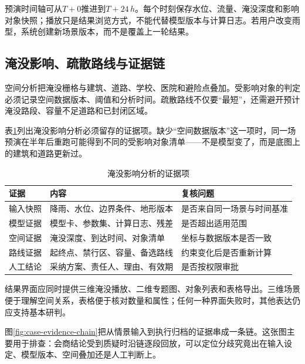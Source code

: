 预演时间轴可从$T+0$推进到$T+24\,h$。每个时刻保存水位、流量、淹没深度和影响对象快照；播放只是结果浏览方式，不能代替模型版本与计算日志。若用户改变雨型，系统创建新场景版本，而不是覆盖上一轮结果。

\subsection{淹没影响、疏散路线与证据链}

空间分析把淹没栅格与建筑、道路、学校、医院和避险点叠加。受影响对象的判定必须记录空间数据版本、阈值和分析时间。疏散路线不仅要“最短”，还需避开预计淹没路段、容量不足道路和已封闭区域。

表\ref{tab:inundation-evidence}列出淹没影响分析必须留存的证据项。缺少“空间数据版本”这一项时，同一场预演在半年后重跑可能得到不同的受影响对象清单——不是模型变了，而是底图上的建筑和道路更新过。

\begin{table}[htbp]
\centering
\caption{淹没影响分析的证据项}
\label{tab:inundation-evidence}
\begin{tabular}{p{2.6cm}p{4.6cm}p{5.3cm}}
\toprule
证据 & 内容 & 复核问题 \\
\midrule
输入快照 & 降雨、水位、边界条件、地形版本 & 是否来自同一场景与时间基准 \\
模型证据 & 模型卡、参数集、计算日志、残差 & 是否超出适用范围 \\
空间证据 & 淹没深度、到达时间、对象清单 & 坐标与数据版本是否一致 \\
路线证据 & 起终点、禁行区、容量、备选路线 & 约束变化后是否重新计算 \\
人工结论 & 采纳方案、责任人、理由、有效期 & 是否按权限审批 \\
\bottomrule
\end{tabular}
\end{table}

结果界面应同时提供三维淹没播放、二维专题图、对象列表和表格导出。三维场景便于理解空间关系，表格便于核对数量和属性；任何一种界面失败时，其他表达仍应支持基本研判。

图\ref{fig:case-evidence-chain}把从情景输入到执行归档的证据串成一条链。这张图主要用于排查：会商结论受到质疑时沿链逐段回放，可以定位分歧究竟出在输入设定、模型版本、空间叠加还是人工判断上。

